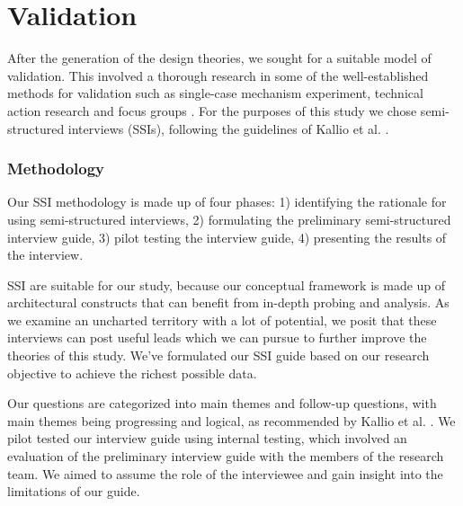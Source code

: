 \documentclass[a4paper,11pt,article,oneside]{memoir}
\begin{document}


\chapter{Validation}

After the generation of the design theories, we sought for a suitable model of validation. This involved a thorough research in some of the well-established methods for validation such as single-case mechanism experiment, technical action research and focus groups \cite{wieringa2014design}. For the purposes of this study we chose semi-structured interviews (SSIs), following the guidelines of Kallio et al. \cite{kallio2016systematic}.  

\subsection{Methodology}
Our SSI methodology is made up of four phases: 1) identifying the rationale for using semi-structured interviews, 2) formulating the preliminary semi-structured interview guide, 3) pilot testing the interview guide, 4) presenting the results of the interview. 

SSI are suitable for our study, because our conceptual framework is made up of architectural constructs that can benefit from in-depth probing and analysis. As we examine an uncharted territory with a lot of potential, we posit that these interviews can post useful leads which we can pursue to further improve the theories of this study. We've formulated our SSI guide based on our research objective to achieve the richest possible data. 


Our questions are categorized into main themes and follow-up questions, with main themes being progressing and logical, as recommended by Kallio et al. \cite{kallio2016systematic}. We pilot tested our interview guide using internal testing, which involved an evaluation of the preliminary interview guide with the members of the research team. We aimed to assume the role of the interviewee and gain insight into the limitations of our guide.

\end{document}
